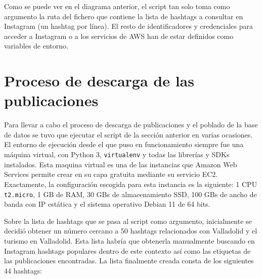 Como se puede ver en el diagrama anterior, el script tan solo toma como argumento la ruta del fichero que contiene la lista de hashtags a consultar en Instagram (un hashtag por línea). El resto de identificadores y credenciales para acceder a Instagram o a los servicios de AWS han de estar definidos como variables de entorno.

\section{Proceso de descarga de las publicaciones}

Para llevar a cabo el proceso de descarga de publicaciones y el poblado de la base de datos se tuvo que ejecutar el script de la sección anterior en varias ocasiones. El entorno de ejecución desde el que puso en funcionamiento siempre fue una máquina virtual, con Python 3, \texttt{virtualenv} y todas las librerías y SDKs instalados. Esta maquina virtual es una de las instancias que Amazon Web Services permite crear en su capa gratuita mediante su servicio EC2. Exactamente, la configuración escogida para esta instancia es la siguiente: 1 CPU \texttt{t2.micro}, 1 GB de RAM, 30 GBs de almacenamiento SSD, 100 GBs de ancho de banda con IP estática y el sistema operativo Debian 11 de 64 bits.

Sobre la lista de hashtags que se pasa al script como argumento, inicialmente se decidió obtener un número cercano a 50 hashtags relacionados con Valladolid y el turismo en Valladolid. Esta lista habría que obtenerla manualmente buscando en Instagram hashtags populares dentro de este contexto así como las etiquetas de las publicaciones encontradas. La lista finalmente creada consta de los siguientes 44 hashtags:

